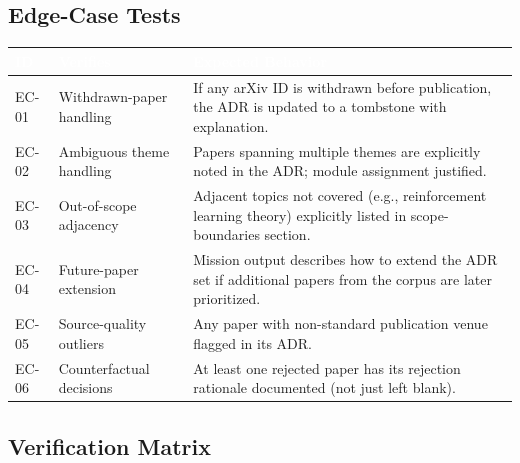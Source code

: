 \documentclass[11pt,letterpaper]{article}
\newcommand{\tableheader}[1]{\textbf{\sffamily\textcolor{white}{#1}}}
\begin{document}
\subsection{Edge-Case Tests}

\begin{center}
\begin{tabularx}{\textwidth}{C{1.2cm}L{4cm}X}
\toprule
{}
\tableheader{ID} & \tableheader{Verifies} & \tableheader{Expected Behavior} \\
\midrule
EC-01 & Withdrawn-paper handling & If any arXiv ID is withdrawn before publication, the ADR is updated to a tombstone with explanation. \\
EC-02 & Ambiguous theme handling & Papers spanning multiple themes are explicitly noted in the ADR; module assignment justified. \\
EC-03 & Out-of-scope adjacency & Adjacent topics not covered (e.g., reinforcement learning theory) explicitly listed in scope-boundaries section. \\
EC-04 & Future-paper extension & Mission output describes how to extend the ADR set if additional papers from the corpus are later prioritized. \\
EC-05 & Source-quality outliers & Any paper with non-standard publication venue flagged in its ADR. \\
EC-06 & Counterfactual decisions & At least one rejected paper has its rejection rationale documented (not just left blank). \\
\bottomrule
\end{tabularx}
\end{center}

\subsection{Verification Matrix}
\end{document}
